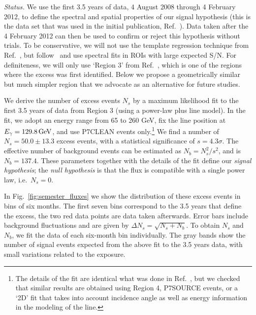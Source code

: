 \documentclass[aps,prd,superscriptaddress,nofootinbib,fixlfloat, 12pt]{revtex4-1}
\begin{document}
\emph{Status.} 
We use the first 3.5 years of data, 4 August 2008 through 4 February 2012, to
define the spectral and spatial properties of our signal hypothesis (this is
the data set that was used in the initial publication,
Ref.~\cite{Bringmann:2012}). Data taken after the 4 February 2012 can then be
used to confirm or reject this hypothesis without trials. To be conservative,
we will not use the template regression technique from Ref.~\cite{linepaper},
but follow~\cite{Bringmann:2012, Weniger:2012} and use spectral fits in ROIs
with large expected S/N.  For definiteness, we will only use `Region 3' from
Ref.~\cite{Weniger:2012}, which is one of the regions where the excess was
first identified. Below we
propose a geometrically similar but much simpler region that we advocate as an
alternative for future studies.

We derive the number of excess events $N_s$ by a maximum likelihood fit to the
first 3.5 years of data from Region 3 (using a power-law plus line model). In
the fit, we adopt an energy range from 65 to 260 GeV, fix the line position at
$E_\gamma=129.8\rm\,GeV$, and use P7CLEAN events only.\footnote{The details of
the fit are identical what was done in Ref.~\cite{Weniger:2012}, but we
checked that similar results are obtained using Region 4, P7SOURCE events,
or a `2D' fit that takes into account incidence angle as well as energy
information in the modeling of the line.} We find a number of $N_s=50.0\pm 13.3$
excess events, with a
statistical significance of $s=4.3\sigma$. The effective number
of background events can be estimated as $N_b = N_s^2/s^2$, and is $N_b=137.4$.
These parameters together with the details of the fit define our \emph{signal
hypothesis}; the \emph{null hypothesis} is that the flux is compatible with a
single power law, i.e.~$N_s=0$.

In Fig.~\ref{fig:semester_fluxes} we show the distribution of these excess events in bins of six
months. The first seven bins correspond to the 3.5 years that define the
excess, the two red data points are data taken afterwards. Error bars include
background fluctuations and are given by $\Delta N_s = \sqrt{N_s+N_b}$. To
obtain $N_s$ and $N_b$, we fit the data of each six-month bin
individually. The gray bands show the number of signal events expected from
the above fit to the 3.5 years data, with small variations related to
the exposure.
\end{document}
